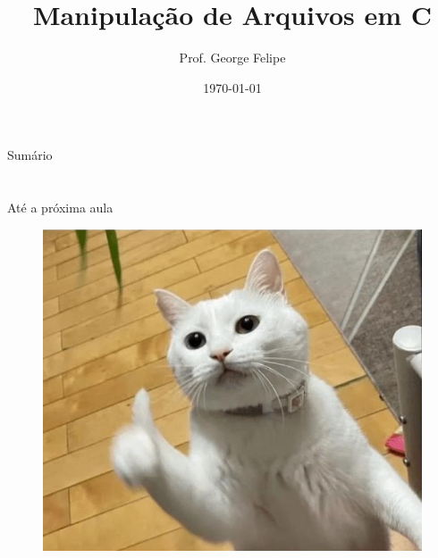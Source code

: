 \documentclass[handout,t]{beamer}
\title[Aula 04]{
	Manipulação de Arquivos em C}
\date{\today}
\author[Algoritmos e Estrutura de Dados I]{
    Prof. George Felipe\inst{1}}
\institute[UFERSA]{	
	\inst{1}%
	Departamento De Engenharias e Tecnologia}
\begin{document}
\frame{\titlepage}
\section[]{}
\begin{frame}{Sumário}
	\tableofcontents
\end{frame}




\section{}
\begin{frame}{Até a próxima aula}
        \begin{figure}
        \centering
        \includegraphics[width=0.75\linewidth]{figuras/coolcat.png}
    \end{figure}
\end{frame}
\end{document}
